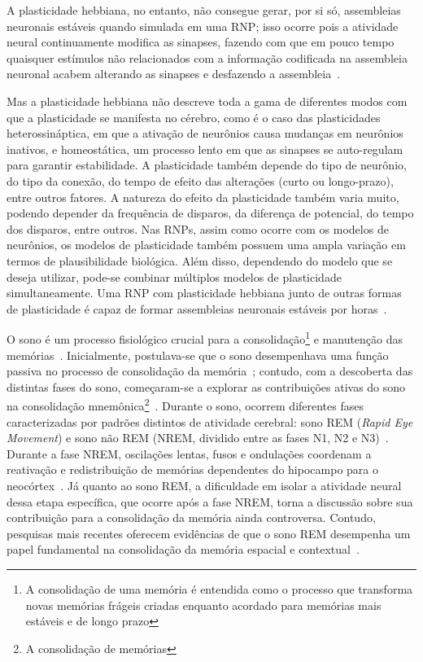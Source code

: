 A plasticidade hebbiana, no entanto, não consegue gerar, por si só, assembleias neuronais estáveis quando simulada em uma RNP;\@
isso ocorre pois a atividade neural continuamente modifica as sinapses, fazendo com que em pouco tempo quaisquer estímulos não
relacionados com a informação codificada na assembleia neuronal acabem alterando as sinapses e desfazendo a
assembleia~\cite{gerstnerSpiking2002}.

Mas a plasticidade hebbiana não descreve toda a gama de diferentes modos com que a plasticidade se manifesta no cérebro, como é o
caso das  plasticidades heterossináptica, em que a ativação de neurônios causa mudanças em neurônios inativos, e homeostática, um
processo lento em que as sinapses se auto-regulam para garantir estabilidade. A plasticidade também depende do tipo de neurônio,
do tipo da conexão, do tempo de efeito das alterações (curto ou longo-prazo), entre outros fatores. A natureza do efeito da
plasticidade também varia muito, podendo depender da frequência de disparos, da diferença de potencial, do tempo dos disparos,
entre outros. Nas RNPs, assim como ocorre com os modelos de neurônios, os modelos de plasticidade também possuem uma ampla
variação em termos de plausibilidade biológica. Além disso, dependendo do modelo que se deseja utilizar, pode-se combinar
múltiplos modelos de plasticidade simultaneamente. Uma RNP com plasticidade hebbiana junto de outras formas de plasticidade é
capaz de formar assembleias neuronais estáveis por horas~\cite{zenkeDiverse2015}.

O sono é um processo fisiológico crucial para a consolidação\footnote{A consolidação de uma memória é entendida como o processo
que transforma novas memórias frágeis criadas enquanto acordado para memórias mais estáveis e de longo prazo} e manutenção das
memórias~\cite{blissittSleep2001, walkerSleep2006, diekelmannMemory2010}. Inicialmente, postulava-se que o sono desempenhava uma
função passiva no processo de consolidação da memória~\cite{jenkinsObliviscence1924}; contudo, com a descoberta das distintas
fases do sono, começaram-se a explorar as contribuições ativas do sono na consolidação mnemônica\footnote{A consolidação de
memórias}~\cite{aserinskyRegularly1953}. Durante o sono, ocorrem diferentes fases caracterizadas por padrões distintos de
atividade cerebral: sono REM (\textit{Rapid Eye Movement}) e sono não REM (NREM, dividido entre as fases N1, N2 e
N3)~\cite{schulzRethinking2008}. Durante a fase NREM, oscilações lentas, fusos e ondulações coordenam a reativação e
redistribuição de memórias dependentes do hipocampo para o neocórtex~\cite{diekelmannMemory2010}. Já quanto ao sono REM, a
dificuldade em isolar a atividade neural dessa etapa específica, que ocorre após a fase NREM, torna a discussão sobre sua
contribuição para a consolidação da memória ainda controversa. Contudo, pesquisas mais recentes oferecem evidências de que o sono
REM desempenha um papel fundamental na consolidação da memória espacial e contextual~\cite{boyceREM2017}.

